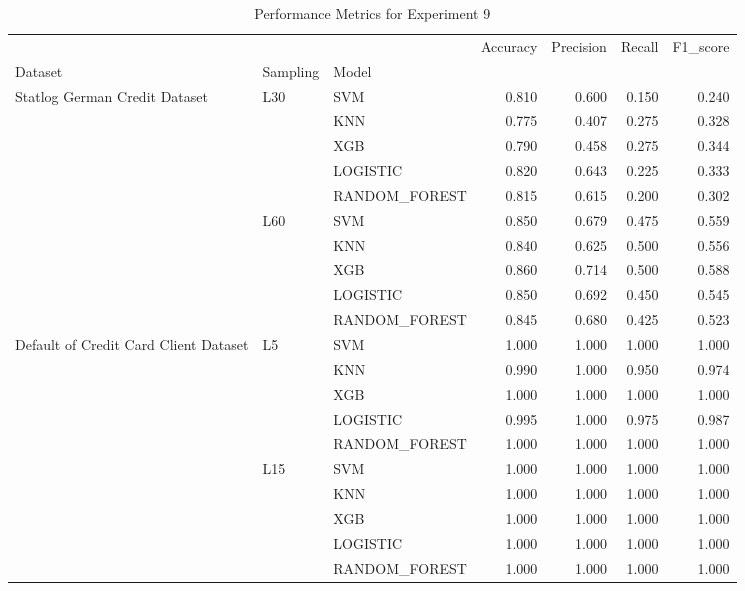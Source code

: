 \begin{table}
\caption{Performance Metrics for Experiment 9}
\label{tab:experiment_9_results}
\begin{tabular}{lllrrrr}
\toprule
 &  &  & Accuracy & Precision & Recall & F1\_score \\
Dataset & Sampling & Model &  &  &  &  \\
\midrule
\multirow[t]{10}{*}{Statlog German Credit Dataset} & \multirow[t]{5}{*}{L30} & SVM & 0.810 & 0.600 & 0.150 & 0.240 \\
 &  & KNN & 0.775 & 0.407 & 0.275 & 0.328 \\
 &  & XGB & 0.790 & 0.458 & 0.275 & 0.344 \\
 &  & LOGISTIC & 0.820 & 0.643 & 0.225 & 0.333 \\
 &  & RANDOM\_FOREST & 0.815 & 0.615 & 0.200 & 0.302 \\
\cline{2-7}
 & \multirow[t]{5}{*}{L60} & SVM & 0.850 & 0.679 & 0.475 & 0.559 \\
 &  & KNN & 0.840 & 0.625 & 0.500 & 0.556 \\
 &  & XGB & 0.860 & 0.714 & 0.500 & 0.588 \\
 &  & LOGISTIC & 0.850 & 0.692 & 0.450 & 0.545 \\
 &  & RANDOM\_FOREST & 0.845 & 0.680 & 0.425 & 0.523 \\
\cline{1-7} \cline{2-7}
\multirow[t]{10}{*}{Default of Credit Card Client Dataset} & \multirow[t]{5}{*}{L5} & SVM & 1.000 & 1.000 & 1.000 & 1.000 \\
 &  & KNN & 0.990 & 1.000 & 0.950 & 0.974 \\
 &  & XGB & 1.000 & 1.000 & 1.000 & 1.000 \\
 &  & LOGISTIC & 0.995 & 1.000 & 0.975 & 0.987 \\
 &  & RANDOM\_FOREST & 1.000 & 1.000 & 1.000 & 1.000 \\
\cline{2-7}
 & \multirow[t]{5}{*}{L15} & SVM & 1.000 & 1.000 & 1.000 & 1.000 \\
 &  & KNN & 1.000 & 1.000 & 1.000 & 1.000 \\
 &  & XGB & 1.000 & 1.000 & 1.000 & 1.000 \\
 &  & LOGISTIC & 1.000 & 1.000 & 1.000 & 1.000 \\
 &  & RANDOM\_FOREST & 1.000 & 1.000 & 1.000 & 1.000 \\
\cline{1-7} \cline{2-7}
\bottomrule
\end{tabular}
\end{table}
